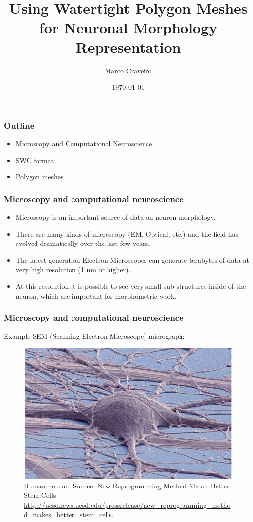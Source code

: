 \documentclass{beamer}
\title{Using Watertight Polygon Meshes for Neuronal Morphology Representation}
\author{
  \texorpdfstring
      {\href{mailto:marco.craveiro@gmail.com}{Marco Craveiro}}
      {Marco Craveiro}
}
\date{\today}
\begin{document}
\begin{frame}
\titlepage
\end{frame}

\begin{frame}
\frametitle{Outline}
\begin{itemize}
\item Microscopy and Computational Neuroscience
\pause
\item SWC format
\pause
\item Polygon meshes
\pause
\end{itemize}
\end{frame}

\begin{frame}
\frametitle{Microscopy and computational neuroscience}

\begin{itemize}

\item Microscopy is an important source of data on neuron morphology.
\pause
\item There are many kinds of microscopy (EM, Optical, etc.) and the
  field has evolved dramatically over the last few years.
\pause
\item The latest generation Electron Microscopes can generate
  terabytes of data at very high resolution (1 nm or higher).
\pause
\item At this resolution it is possible to see very small
  sub-structures inside of the neuron, which are important for
  morphometric work.

\end{itemize}

\end{frame}

\begin{frame}
\frametitle{Microscopy and computational neuroscience}

Example SEM (Scanning Electron Microscope) micrograph:

\begin{figure}[H]
    \centering
    \includegraphics[scale=1.5]{../blog/images/2014_06_26_human_ipsc_derived_neuron_deerinck}
    \caption{Human neuron. Source: New Reprogramming Method Makes Better Stem Cells
      \url{http://ucsdnews.ucsd.edu/pressrelease/new_reprogramming_method_makes_better_stem_cells}.}
    \label{fig:3d_neuron}
\end{figure}

\end{frame}
\end{document}
